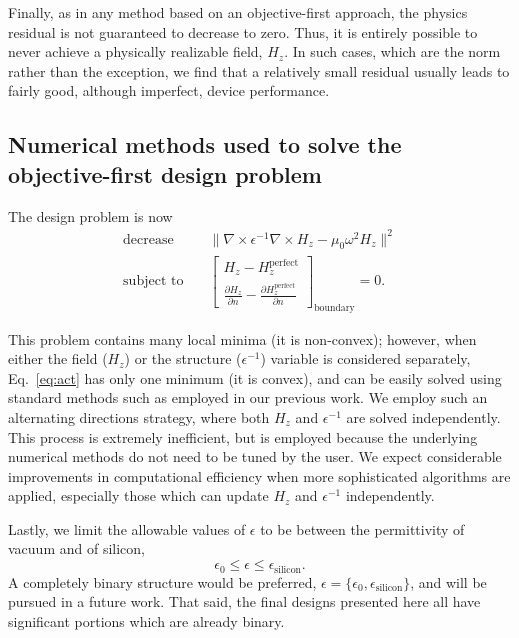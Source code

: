 \documentclass[letterpaper,10pt]{article}
\begin{document}
Finally, as in any method based on an objective-first approach,
    the physics residual is not guaranteed to decrease to zero.
Thus, it is entirely possible to never achieve 
    a physically realizable field, $H_z$.
In such cases, which are the norm rather than the exception,
    we find that a relatively small residual usually leads to
    fairly good, although imperfect, device performance.
    
\subsection{Numerical methods used to solve the objective-first design problem}
The design problem is now
    \begin{subequations}\label{eq:act}
    \begin{align} 
    \text{decrease} & \quad  
        \| \nabla \times \epsilon^{-1} \nabla \times H_z - 
            \mu_0 \omega^2 H_z \|^2 \label{eq:act:obj} \\ 
    \text{subject to} & \quad 
        \begin{bmatrix}
        H_z - H_z^\text{perfect} \\
        \frac{\partial H_z}{\partial n} - 
            \frac{\partial H_z^\text{perfect}}{\partial n}
        \end{bmatrix}_\text{boundary}
        = 0.
    \end{align}
    \end{subequations}

This problem contains many local minima (it is non-convex\cite{boydbook});
    however, when either the field ($H_z$) or the structure ($\epsilon^{-1}$)
    variable is considered separately, Eq.~\ref{eq:act} has only one minimum
    (it is convex), and can be easily solved using standard methods
    such as employed in our previous work\cite{prevwork}.
We employ such an alternating directions strategy,
    where both $H_z$ and $\epsilon^{-1}$ are solved independently.
This process is extremely inefficient,
    but is employed because the underlying numerical methods
    do not need to be tuned by the user.
We expect considerable improvements in computational efficiency
    when more sophisticated algorithms are applied,
    especially those which can update $H_z$ and $\epsilon^{-1}$ independently.
    
Lastly, we limit the allowable values of $\epsilon$ to be between
    the permittivity of vacuum and of silicon,
    \begin{equation}
    \epsilon_0 \le \epsilon \le \epsilon_\text{silicon}.
    \end{equation}
A completely binary structure would be preferred,
    $\epsilon = \{\epsilon_0, \epsilon_\text{silicon}\}$,
    and will be pursued in a future work.
That said, the final designs presented here 
    all have significant portions which are already binary.
\end{document}
